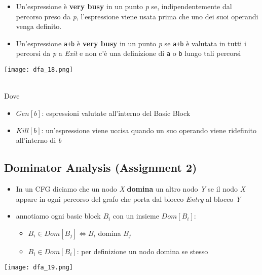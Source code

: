 \noindent\begin{minipage}[c]{.6\textwidth}
\begin{itemize}
  \item Un'espressione \`e \textbf{very busy} in un punto \textit{p} se, indipendentemente dal percorso preso da \textit{p}, l'espressione viene usata prima che uno dei suoi operandi venga definito.
  \item Un'espressione \lstinline|a+b| \`e \textbf{very busy} in un punto \textit{p} se \lstinline|a+b| \`e valutata in tutti i percorsi da \textit{p} a \textit{Exit} e non c'\`e una definizione di \lstinline|a| o \lstinline|b| lungo tali percorsi
\end{itemize}
\end{minipage}\hfill
\begin{minipage}[c]{.35\textwidth}
\texttt{[image: dfa\_18.png]}
\end{minipage}
\\

Dove
\begin{itemize}
  \item $Gen[b]$: espressioni valutate all'interno del Basic Block
  \item $Kill[b]$: un'espressione viene uccisa quando un suo operando viene ridefinito all'interno di \textit{b}
\end{itemize}

\subsection{Dominator Analysis (Assignment 2)}

\noindent \begin{minipage}[c]{.6\textwidth}
\begin{itemize}
  \item In un CFG diciamo che un nodo \textit{X} \textbf{domina} un altro nodo \textit{Y} se il nodo \textit{X} appare in ogni percorso del grafo che porta dal blocco \textit{Entry} al blocco \textit{Y}
  \item annotiamo ogni basic block $B_{i}$ con un insieme $Dom[B_{i}]$:
  \begin{itemize}
    \item $B_{i}\in Dom[B_{j}] \iff B_{i}$ domina $B_{j}$
    \item $B_{i}\in Dom[B_{i}]$: per definizione un nodo domina se stesso
  \end{itemize}
\end{itemize}
\end{minipage}
\hfill
\begin{minipage}[c]{.35\textwidth}
\texttt{[image: dfa\_19.png]}
\end{minipage}

